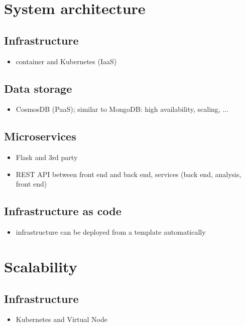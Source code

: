 \documentclass[conference]{IEEEtran}
\begin{document}
\section{System architecture}
\subsection{Infrastructure}
\begin{itemize}
	\item container and Kubernetes (IaaS)
\end{itemize}
 
\subsection{Data storage}
\begin{itemize}
	\item CosmosDB (PaaS); similar to MongoDB: high availability, scaling, ...
\end{itemize}

\subsection{Microservices}
\begin{itemize}
	\item Flask and 3rd party
	\item REST API between front end and back end,  services (back end, analysis, front end)
\end{itemize}

\subsection{Infrastructure as code}
\begin{itemize}
	\item infrastructure can be deployed from a template automatically
\end{itemize}

\section{Scalability}
\subsection{Infrastructure}
\begin{itemize}
	\item Kubernetes and Virtual Node
\end{itemize}
\end{document}
